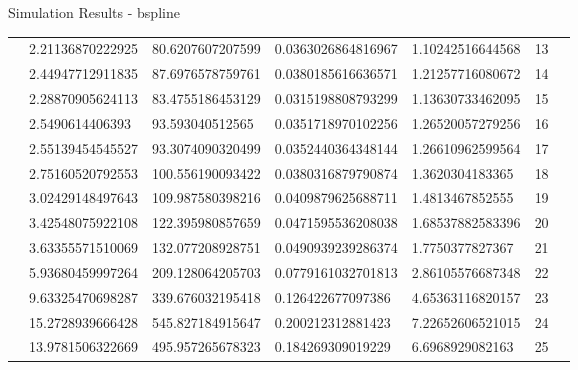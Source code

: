 \documentclass{beamer}
\begin{document}
\begin{frame}{Simulation Results - bspline}
\begin{table}
{\begin{tabular}{lllllll}
 & 2.21136870222925                        & 80.6207607207599                        & 0.0363026864816967                        & 1.10242516644568                        & 13                &  \\
 & 2.44947712911835                        & 87.6976578759761                        & 0.0380185616636571                        & 1.21257716080672                        & 14                &  \\
 & 2.28870905624113                        & 83.4755186453129                        & 0.0315198808793299                        & 1.13630733462095                        & 15                &  \\
 & 2.5490614406393                         & 93.593040512565                         & 0.0351718970102256                        & 1.26520057279256                        & 16                &  \\
 & 2.55139454545527                        & 93.3074090320499                        & 0.0352440364348144                        & 1.26610962599564                        & 17                &  \\
 & 2.75160520792553                        & 100.556190093422                        & 0.0380316879790874                        & 1.3620304183365                         & 18                &  \\
 & 3.02429148497643                        & 109.987580398216                        & 0.0409879625688711                        & 1.4813467852555                         & 19                &  \\
 & 3.42548075922108                        & 122.395980857659                        & 0.0471595536208038                        & 1.68537882583396                        & 20                &  \\
 & 3.63355571510069                        & 132.077208928751                        & 0.0490939239286374                        & 1.7750377827367                         & 21                &  \\
 & 5.93680459997264                        & 209.128064205703                        & 0.0779161032701813                        & 2.86105576687348                        & 22                &  \\
 & 9.63325470698287                        & 339.676032195418                        & 0.126422677097386                         & 4.65363116820157                        & 23                &  \\
 & 15.2728939666428                        & 545.827184915647                        & 0.200212312881423                         & 7.22652606521015                        & 24                &  \\
 & 13.9781506322669                        & 495.957265678323                        & 0.184269309019229                         & 6.6968929082163                         & 25                & 
\end{tabular}%
}
\end{table}
	\end{frame}
	
\end{document}

